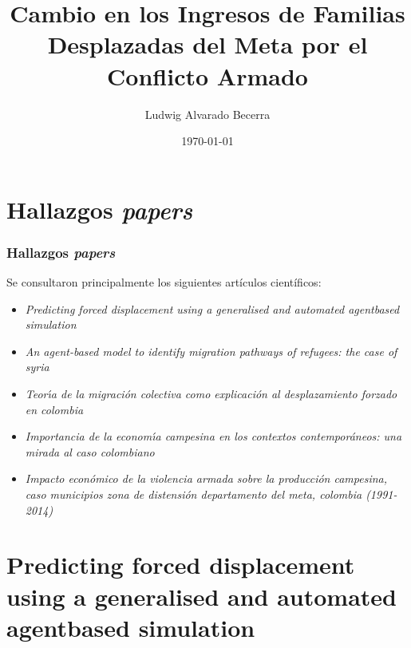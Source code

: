 \documentclass[17pt, t, lualatex]{beamer}
\title{\LARGE Cambio en los Ingresos de Familias Desplazadas del Meta por el Conflicto Armado}
\date{\today}
\institute[UJTL]{Universidad Jorge Tadeo Lozano}
\author{Ludwig Alvarado Becerra}
\begin{document}
\inserttitlepage

\section{Hallazgos \textit{papers}}

\insertsectionpage

\begin{frame}[allowframebreaks]
  \frametitle{Hallazgos \textit{papers}}
  Se consultaron principalmente los siguientes artículos científicos:
  \begin{itemize}
    \item \textit{Predicting forced displacement using a generalised and automated agentbased simulation} \cite{suleimenova2020predicting}
    \item \textit{An agent-based model to identify migration pathways of refugees: the case of syria} \cite{hebert2017agent}
    \item \textit{Teorı́a de la migración colectiva como explicación al desplazamiento forzado en colombia} \cite{Gutierrez2012}
    \item \textit{Importancia de la economı́a campesina en los contextos contemporáneos: una mirada al caso colombiano}\cite{santacoloma2015importancia}
    \item \textit{Impacto económico de la violencia armada sobre la producción campesina, caso municipios zona de distensión departamento del meta, colombia (1991-2014)} \cite{perez2016impacto}
  \end{itemize}

\end{frame}

\section{Predicting forced displacement using a generalised and automated
  agentbased simulation}


\insertsectionpage
\end{document}
